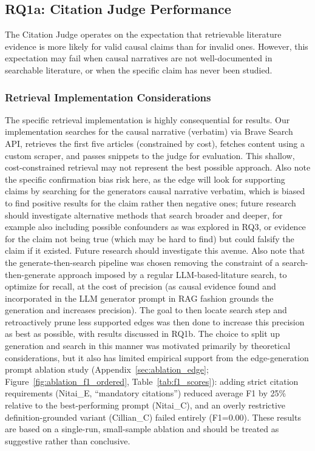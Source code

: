 \subsection{RQ1a: Citation Judge Performance}
\label{sec:discussion_rq1a_citation}

The Citation Judge operates on the expectation that retrievable literature evidence is more likely for valid causal claims than for invalid ones. However, this expectation may fail when causal narratives are not well-documented in searchable literature, or when the specific claim has never been studied.

\subsubsection{Retrieval Implementation Considerations}

The specific retrieval implementation is highly consequential for results. Our implementation searches for the causal narrative (verbatim) via Brave Search API, retrieves the first five articles (constrained by cost), fetches content using a custom scraper, and passes snippets to the judge for evaluation. This shallow, cost-constrained retrieval may not represent the best possible approach. Also note the specific confirmation bias risk here, as the edge will look for supporting claims by searching for the generators causal narrative verbatim, which is biased to find positive results for the claim rather then negative ones; future research should investigate alternative methods that search broader and deeper, for example also including possible confounders as was explored in RQ3, or evidence for the claim not being true (which may be hard to find) but could falsify the claim if it existed. Future research should investigate this avenue.  Also note that the generate-then-search pipeline was chosen removing the constraint of a search-then-generate approach imposed by a regular LLM-based-litature search, to optimize for recall, at the cost of precision (as causal evidence found and incorporated in the LLM generator prompt in RAG fashion grounds the generation and increases precision). 
The goal to then locate search step and retroactively prune less supported edges was then done to increase this precision as best as possible, with results discussed in RQ1b.
The choice to split up generation and search in this manner was motivated primarily by theoretical considerations, but it also has limited empirical support from the edge-generation prompt ablation study (Appendix~\ref{sec:ablation_edge}; Figure~\ref{fig:ablation_f1_ordered}, Table~\ref{tab:f1_scores}): adding strict citation requirements (Nitai\_E, ``mandatory citations'') reduced average F1 by 25\% relative to the best-performing prompt (Nitai\_C), and an overly restrictive definition-grounded variant (Cillian\_C) failed entirely (F1=0.00). These results are based on a single-run, small-sample ablation and should be treated as suggestive rather than conclusive.

